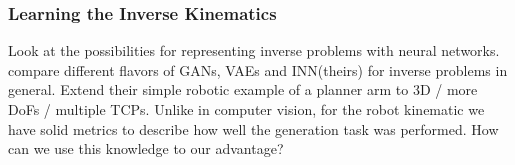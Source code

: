 \documentclass[a4paper]{article}
\begin{document}


\subsubsection{Learning the Inverse Kinematics}
Look at the possibilities for representing inverse problems with neural networks.
~\cite{Ardizzone2018} compare different flavors of GANs, VAEs and INN(theirs) for inverse problems in general.
Extend their simple robotic example of a planner arm to 3D / more DoFs / multiple TCPs.
Unlike in computer vision, for the robot kinematic we have solid metrics to describe how well the generation task was performed.
How can we use this knowledge to our advantage?
\end{document}
